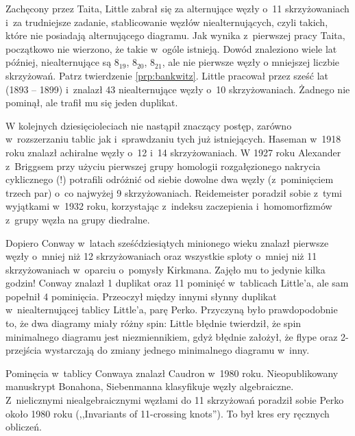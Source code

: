 {Zachęcony przez Taita, Little zabrał się za alternujące węzły o~11 skrzyżowaniach i~za trudniejsze zadanie, stablicowanie węzłów niealternujących, czyli takich, które nie posiadają alternującego diagramu.
Jak wynika z~pierwszej pracy Taita, początkowo nie wierzono, że takie w~ogóle istnieją.
Dowód znaleziono wiele lat później, niealternujące są $8_{19}$, $8_{20}$, $8_{21}$, ale nie pierwsze węzły o mniejszej liczbie skrzyżowań.
Patrz twierdzenie \ref{prp:bankwitz}.
Little pracował przez sześć lat (1893 -- 1899) i~znalazł 43 niealternujące węzły o~10 skrzyżowaniach.
Żadnego nie pominął, ale trafił mu się jeden duplikat.

W kolejnych dziesięcioleciach nie nastąpił znaczący postęp, zarówno w~rozszerzaniu tablic jak i~sprawdzaniu tych już istniejących.
Haseman w~1918 roku znalazł achiralne węzły o~12 i~14 skrzyżowaniach.
W 1927 roku Alexander z~Briggsem przy użyciu pierwszej grupy homologii rozgałęzionego nakrycia cyklicznego (!) potrafili odróżnić od siebie dowolne dwa węzły (z~pominięciem trzech par) o~co najwyżej 9 skrzyżowaniach.
Reidemeister poradził sobie z~tymi wyjątkami w~1932 roku, korzystając z~indeksu zaczepienia i~homomorfizmów z~grupy węzła na grupy diedralne.


Dopiero Conway w~latach sześćdziesiątych minionego wieku znalazł pierwsze węzły o~mniej niż 12 skrzyżowaniach oraz wszystkie sploty o~mniej niż 11 skrzyżowaniach w~oparciu o~pomysły Kirkmana.
Zajęło mu to jedynie kilka godzin!
Conway znalazł 1 duplikat oraz 11 pominięć w~tablicach Little'a, ale sam popełnił 4 pominięcia.
Przeoczył między innymi słynny duplikat w~niealternującej tablicy Little'a, parę Perko.
Przyczyną było prawdopodobnie to, że dwa diagramy miały różny spin:
Little błędnie twierdził, że spin minimalnego diagramu jest niezmiennikiem, gdyż błędnie założył, że flype oraz 2-przejścia wystarczają do zmiany jednego minimalnego diagramu w~inny.

Pominęcia w~tablicy Conwaya znalazł Caudron w~1980 roku.
Nieopublikowany manuskrypt Bonahona, Siebenmanna klasyfikuje węzły algebraiczne.
Z~nielicznymi niealgebraicznymi węzłami do 11 skrzyżowań poradził sobie Perko około 1980 roku (,,Invariants of 11-crossing knots'').
To był kres ery ręcznych obliczeń.

}
